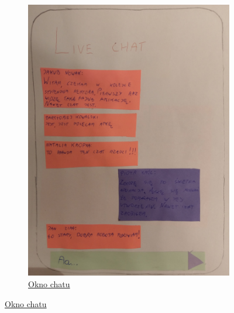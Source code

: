 \documentclass[12pt]{article}
\begin{document}
\begin{figure}[h!]
\begin{subfigure}[ba]{1\linewidth}
	\includegraphics[width=\linewidth]{zdj/7.jpg}
	\caption{\underline{Okno chatu}}
\end{subfigure}
\end{figure}
\end{document}
